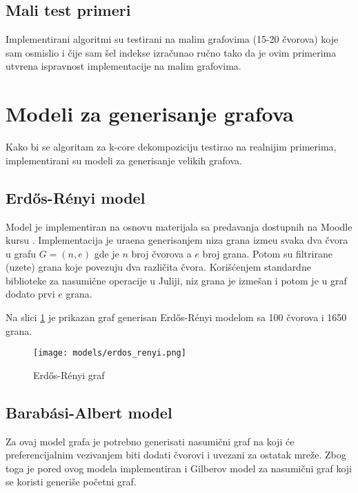 \documentclass[11pt,a4paper]{article}
\begin{document}
\subsection{Mali test primeri}

Implementirani algoritmi su testirani na malim grafovima (15-20 \v cvorova) koje sam osmislio i \v cije sam \v sel indekse izra\v cunao ru\v cno tako da je ovim primerima utvr\dj ena ispravnost implementacije na malim grafovima.

\section{Modeli za generisanje grafova}

Kako bi se algoritam za k-core dekompoziciju testirao na realnijim primerima, implementirani su modeli za generisanje velikih grafova.

\subsection{Erd\H os-R\' enyi model}

Model je implementiran na osnovu materijala sa predavanja dostupnih na Moodle kursu \cite{moodle}. Implementacija je ura\dj ena generisanjem niza grana izme\dj u svaka dva \v cvora u grafu $ G = (n, e) $ gde je $ n $ broj \v cvorova a $ e $ broj grana. Potom su filtrirane (uzete) grana koje povezuju dva razli\v cita \v cvora. Kori\v s\' cenjem standardne biblioteke za nasumi\v cne operacije u Juliji, niz grana je izme\v san i potom je u graf dodato prvi $ e $ grana.

Na slici \ref{fig:erdos-renyi} je prikazan graf generisan Erd\H os-R\' enyi modelom sa 100 \v cvorova i 1650 grana.

\begin{figure}[h!]
    \centering
    \texttt{[image: models/erdos\_renyi.png]}
    \caption{Erd\H os-R\' enyi graf}
    \label{fig:erdos-renyi}
\end{figure}

\subsection{Barab\' asi-Albert model}

Za ovaj model grafa je potrebno generisati nasumi\v cni graf na koji \' ce preferencijalnim vezivanjem biti dodati \v cvorovi i uvezani za ostatak mre\v ze. Zbog toga je pored ovog modela implementiran i Gilberov model za nasumi\v cni graf koji se koristi generi\v se po\v cetni graf.
\end{document}
